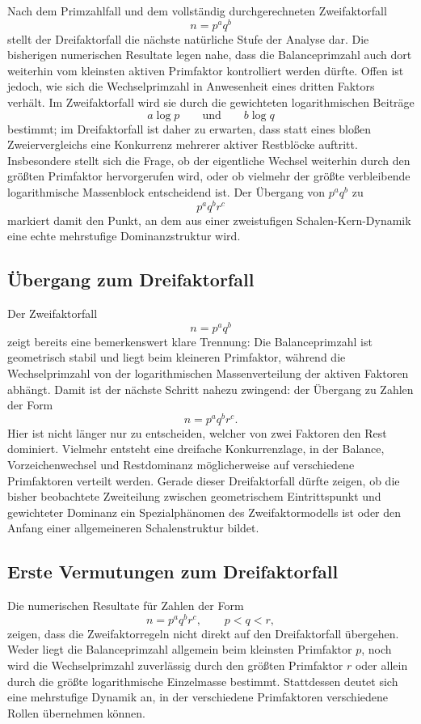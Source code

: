 \documentclass[11pt,a4paper]{article}
\theoremstyle{definition}
\theoremstyle{remark}
\begin{document}
	Nach dem Primzahlfall und dem vollständig durchgerechneten Zweifaktorfall
	\[
	n=p^a q^b
	\]
	stellt der Dreifaktorfall die nächste natürliche Stufe der Analyse dar. Die bisherigen
	numerischen Resultate legen nahe, dass die Balanceprimzahl auch dort weiterhin vom
	kleinsten aktiven Primfaktor kontrolliert werden dürfte. Offen ist jedoch, wie sich die
	Wechselprimzahl in Anwesenheit eines dritten Faktors verhält. Im Zweifaktorfall wird sie
	durch die gewichteten logarithmischen Beiträge
	\[
	a\log p
	\qquad\text{und}\qquad
	b\log q
	\]
	bestimmt; im Dreifaktorfall ist daher zu erwarten, dass statt eines bloßen
	Zweiervergleichs eine Konkurrenz mehrerer aktiver Restblöcke auftritt. Insbesondere stellt
	sich die Frage, ob der eigentliche Wechsel weiterhin durch den größten Primfaktor
	hervorgerufen wird, oder ob vielmehr der größte verbleibende logarithmische Massenblock
	entscheidend ist. Der Übergang von \(p^a q^b\) zu
	\[
	p^a q^b r^c
	\]
	markiert damit den Punkt, an dem aus einer zweistufigen Schalen-Kern-Dynamik eine echte
	mehrstufige Dominanzstruktur wird.
	
	\subsection{Übergang zum Dreifaktorfall}
	
	Der Zweifaktorfall
	\[
	n=p^a q^b
	\]
	zeigt bereits eine bemerkenswert klare Trennung: Die Balanceprimzahl ist geometrisch stabil
	und liegt beim kleineren Primfaktor, während die Wechselprimzahl von der logarithmischen
	Massenverteilung der aktiven Faktoren abhängt. Damit ist der nächste Schritt nahezu
	zwingend: der Übergang zu Zahlen der Form
	\[
	n=p^a q^b r^c.
	\]
	Hier ist nicht länger nur zu entscheiden, welcher von zwei Faktoren den Rest dominiert.
	Vielmehr entsteht eine dreifache Konkurrenzlage, in der Balance, Vorzeichenwechsel und
	Restdominanz möglicherweise auf verschiedene Primfaktoren verteilt werden. Gerade dieser
	Dreifaktorfall dürfte zeigen, ob die bisher beobachtete Zweiteilung zwischen geometrischem
	Eintrittspunkt und gewichteter Dominanz ein Spezialphänomen des Zweifaktormodells ist oder
	den Anfang einer allgemeineren Schalenstruktur bildet.
	
	\subsection{Erste Vermutungen zum Dreifaktorfall}
	
	Die numerischen Resultate für Zahlen der Form
	\[
	n=p^a q^b r^c,\qquad p<q<r,
	\]
	zeigen, dass die Zweifaktorregeln nicht direkt auf den Dreifaktorfall übergehen. Weder
	liegt die Balanceprimzahl allgemein beim kleinsten Primfaktor \(p\), noch wird die
	Wechselprimzahl zuverlässig durch den größten Primfaktor \(r\) oder allein durch die
	größte logarithmische Einzelmasse bestimmt. Stattdessen deutet sich eine mehrstufige
	Dynamik an, in der verschiedene Primfaktoren verschiedene Rollen übernehmen können.
	
\end{document}
